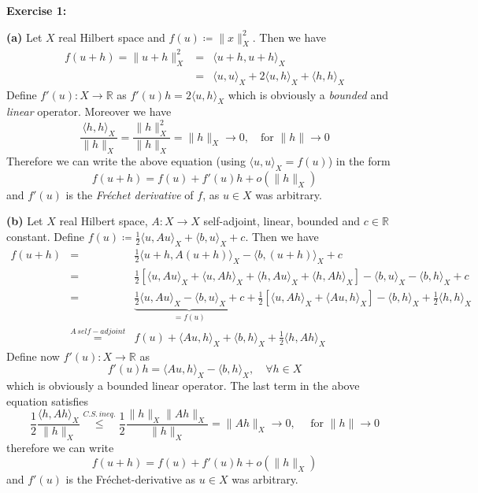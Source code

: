 \documentclass[a4paper]{amsart}
\begin{document}
	\textbf{Exercise 1: }\par
	\textbf{(a) } Let $X$ real Hilbert space and $f(u) \coloneqq \|x\|^2_X$. Then we have
	\begin{eqnarray}
		f(u+h) = \|u+h\|^2_X 	&=& \langle u+h, u+h\rangle_X \nonumber\\ 
								&=& \langle u,u\rangle_X + 2\langle u,h\rangle_X + \langle h,h\rangle_X	\nonumber	
	\end{eqnarray}
	Define $f'(u) : X\to\mathbb{R}$ as $f'(u)h = 2\langle u,h\rangle_X$ which is obviously a \emph{bounded} and \emph{linear} operator. Moreover we have
	\[
		\frac{\langle h,h\rangle_X}{\|h\|_X} = \frac{\|h\|^2_X}{\|h\|_X} = \|h\|_X \to 0,\quad\text{for }\|h\|\to 0 
	\]
	Therefore we can write the above equation (using $\langle u,u\rangle_X = f(u)$) in the form
	\[
		 f(u+h) = f(u) + f'(u)h + o(\|h\|_X)
	\]
	and $f'(u)$ is the \emph{Fréchet derivative} of $f$, as $u\in X$ was arbitrary.\par

	\textbf{(b) } Let $X$ real Hilbert space, $A:X\to X$ self-adjoint, linear, bounded and $c\in\mathbb{R}$ constant. Define $f(u) \coloneqq \frac{1}{2}\langle u,Au\rangle_X + \langle b,u\rangle_X + c$. Then we have
	\begin{eqnarray*}
		f(u+h) 	&=& \frac{1}{2}\langle u+h,A(u+h)\rangle_X - \langle b,(u+h)\rangle_X + c\\
				&=& \frac{1}{2}\left[\langle u,Au\rangle_X+\langle u,Ah\rangle_X + \langle h,Au\rangle_X+\langle h,Ah\rangle_X\right] - \langle b,u\rangle_X - \langle b,h\rangle_X + c\\
				&=& \underbrace{\frac{1}{2}\langle u,Au\rangle_X - \langle b,u\rangle_X + c}_{=f(u)} + \frac{1}{2}\left[\langle u,Ah\rangle_X+\langle Au,h\rangle_X\right] - \langle b,h\rangle_X + \frac{1}{2}\langle h,h\rangle_X \\
				&\overset{A\,self-adjoint}=& f(u) + \langle Au,h\rangle_X + \langle b,h\rangle_X + \frac{1}{2}\langle h,Ah\rangle_X
	\end{eqnarray*}
	Define now $f'(u): X\to\mathbb{R}$ as 
	\[
		f'(u)h = \langle Au,h\rangle_X -\langle b,h\rangle_X,\quad\forall h\in X
	\]
	which is obviously a bounded linear operator. The last term in the above equation satisfies
	\[
		\frac{1}{2}\frac{\langle h,Ah\rangle_X}{\|h\|_X} \overset{C.S.\,ineq.}\leq \frac{1}{2}\frac{\|h\|_X\|Ah\|_X}{\|h\|_X} = \|Ah\|_X \to 0,\quad\text{ for }\|h\|\to 0
	\]
	therefore we can write
	\[
		f(u+h) = f(u) + f'(u)h + o(\|h\|_X)
	\]
	and $f'(u)$ is the Fréchet-derivative as $u\in X$ was arbitrary.\par
\end{document}
